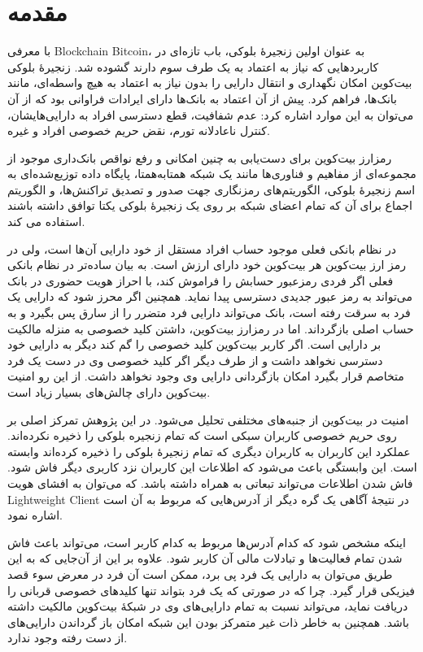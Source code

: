
\chapter{مقدمه}
با معرفی \gls{Blockchain} \gls{Bitcoin}، به عنوان اولین زنجیرهٔ بلوکی، باب تازه‌ای در کاربرد‌هایی که نیاز به اعتماد به یک طرف سوم دارند گشوده شد. زنجیرهٔ بلوکی بیت‌کوین امکان نگهداری و انتقال دارایی را بدون نیاز به اعتماد به هیچ واسطه‌ای، مانند بانک‌ها،‌ فراهم کرد. پیش از آن اعتماد به بانک‌ها دارای ایرادات فراوانی بود که از آن می‌توان به این موارد اشاره کرد: عدم شفافیت، قطع دسترسی افراد به دارایی‌هایشان، کنترل ناعادلانه تورم، نقض حریم خصوصی افراد و غیره. 

رمزارز بیت‌کوین برای دست‌یابی به چنین امکانی و رفع نواقص بانک‌داری موجود از مجموعه‌ای از مفاهیم و فناوری‌ها مانند یک شبکه همتا‌به‌همتا، پایگاه داده توزیع‌شده‌ای به اسم زنجیرهٔ بلوکی، الگوریتم‌های رمزنگاری جهت صدور و تصدیق تراکنش‌ها، و الگوریتم اجماع برای آن‌ که تمام اعضای شبکه بر روی یک زنجیرهٔ بلوکی یکتا توافق داشته باشند استفاده می کند. 

در نظام بانکی فعلی موجود حساب افراد مستقل از خود دارایی آن‌ها است، ولی در رمز ارز بیت‌کوین هر بیت‌کوین خود دارای ارزش است. به بیان ساده‌تر در نظام بانکی فعلی اگر فردی رمزعبور حسابش را فراموش کند، با احراز هویت حضوری در بانک می‌تواند به رمز عبور جدیدی دسترسی پیدا نماید. همچنین اگر محرز شود که دارایی یک فرد به سرقت رفته است، بانک می‌تواند دارایی فرد متضرر را از سارق پس بگیرد و به حساب اصلی بازگرداند. اما در رمز‌ارز بیت‌کوین، داشتن کلید خصوصی به منزله مالکیت بر دارایی است. اگر کاربر بیت‌کوین کلید خصوصی را گم کند دیگر به دارایی خود دسترسی نخواهد داشت و از طرف دیگر اگر کلید خصوصی وی در دست یک فرد متخاصم قرار بگیرد امکان بازگردانی دارایی وی وجود نخواهد داشت. از این رو امنیت بیت‌کوین دارای چالش‌های بسیار زیاد است.

امنیت در بیت‌کوین از جنبه‌های مختلفی تحلیل می‌شود. در این پژوهش تمرکز اصلی بر روی حریم خصوصی کاربران سبکی است که تمام زنجیره بلوکی را ذخیره نکرده‌اند. عملکرد این کاربران به کاربران دیگری که تمام زنجیره‌ٔ بلوکی را ذخیره کرده‌اند وابسته است. این وابستگی باعث می‌شود که اطلاعات این کاربران نزد کاربری دیگر فاش شود. فاش شدن اطلاعات می‌تواند تبعاتی به همراه داشته باشد. که می‌توان به افشای هویت 
\gls{Lightweight Client}
در نتیجهٔ آگاهی یک گره دیگر از آدرس‌هایی که مربوط به آن است اشاره نمود. 

اینکه مشخص شود که کدام آدرس‌ها مربوط به کدام کاربر است، می‌تواند باعث فاش شدن تمام فعالیت‌ها و تبادلات مالی آن کاربر شود. علاوه بر این از آن‌جایی که به این طریق می‌توان به دارایی یک فرد پی برد، ممکن است آن فرد در معرض سوء قصد فیزیکی قرار گیرد. چرا که در صورتی که یک فرد بتواند تنها کلید‌های خصوصی قربانی را دریافت نماید، می‌تواند نسبت به تمام دارایی‌های وی در شبکه‌ٔ بیت‌کوین مالکیت داشته باشد. همچنین به خاطر ذات غیر متمرکز بودن این شبکه امکان باز گرداندن دارایی‌های از دست رفته وجود ندارد.

